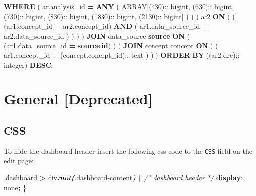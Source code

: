 \documentclass[
]{book}
\newenvironment{Shaded}{\begin{snugshade}}{\end{snugshade}}
\newcommand{\CommentTok}[1]{\textcolor[rgb]{0.56,0.35,0.01}{\textit{#1}}}
\newcommand{\DataTypeTok}[1]{\textcolor[rgb]{0.13,0.29,0.53}{#1}}
\newcommand{\DecValTok}[1]{\textcolor[rgb]{0.00,0.00,0.81}{#1}}
\newcommand{\FunctionTok}[1]{\textcolor[rgb]{0.00,0.00,0.00}{#1}}
\newcommand{\InformationTok}[1]{\textcolor[rgb]{0.56,0.35,0.01}{\textbf{\textit{#1}}}}
\newcommand{\KeywordTok}[1]{\textcolor[rgb]{0.13,0.29,0.53}{\textbf{#1}}}
\newcommand{\NormalTok}[1]{#1}
\newcommand{\OperatorTok}[1]{\textcolor[rgb]{0.81,0.36,0.00}{\textbf{#1}}}
\begin{document}
\begin{Shaded}
\begin{Highlighting}[]
          \KeywordTok{WHERE}
\NormalTok{            (}
\NormalTok{              ar.analysis\_id }\OperatorTok{=} \KeywordTok{ANY}\NormalTok{ (}
                \DataTypeTok{ARRAY}\NormalTok{[(}\DecValTok{430}\NormalTok{):: bigint,}
\NormalTok{                (}\DecValTok{630}\NormalTok{):: bigint,}
\NormalTok{                (}\DecValTok{730}\NormalTok{):: bigint,}
\NormalTok{                (}\DecValTok{830}\NormalTok{):: bigint,}
\NormalTok{                (}\DecValTok{1830}\NormalTok{):: bigint,}
\NormalTok{                (}\DecValTok{2130}\NormalTok{):: bigint]}
\NormalTok{              )}
\NormalTok{            )}
\NormalTok{        ) ar2 }\KeywordTok{ON}\NormalTok{ (}
\NormalTok{          (}
\NormalTok{            (ar1.concept\_id }\OperatorTok{=}\NormalTok{ ar2.concept\_id)}
            \KeywordTok{AND}\NormalTok{ (}
\NormalTok{              ar1.data\_source\_id }\OperatorTok{=}\NormalTok{ ar2.data\_source\_id}
\NormalTok{            )}
\NormalTok{          )}
\NormalTok{        )}
\NormalTok{      )}
      \KeywordTok{JOIN}\NormalTok{ data\_source }\KeywordTok{source} \KeywordTok{ON}\NormalTok{ (}
\NormalTok{        (ar1.data\_source\_id }\OperatorTok{=} \KeywordTok{source}\NormalTok{.}\KeywordTok{id}\NormalTok{)}
\NormalTok{      )}
\NormalTok{    )}
    \KeywordTok{JOIN}\NormalTok{ concept concept }\KeywordTok{ON}\NormalTok{ (}
\NormalTok{      (}
\NormalTok{        ar1.concept\_id }\OperatorTok{=}\NormalTok{ (concept.concept\_id):: text}
\NormalTok{      )}
\NormalTok{    )}
\NormalTok{  )}
\KeywordTok{ORDER} \KeywordTok{BY}\NormalTok{ ((ar2.drc):: }\DataTypeTok{integer}\NormalTok{) }\KeywordTok{DESC}\NormalTok{;}
\end{Highlighting}
\end{Shaded}

\hypertarget{general-deprecated}{%
\section{General {[}Deprecated{]}}\label{general-deprecated}}

\hypertarget{css-2}{%
\subsection*{CSS}\label{css-2}}

To hide the dashboard header insert the following css code to the \texttt{CSS} field on the edit page:

\begin{Shaded}
\begin{Highlighting}[]
\FunctionTok{.dashboard} \OperatorTok{\textgreater{}}\NormalTok{ div}\InformationTok{:not(}\FunctionTok{.dashboard{-}content}\InformationTok{)}\NormalTok{ \{  }\CommentTok{/* dashboard header */}
  \KeywordTok{display}\NormalTok{: }\DecValTok{none}\OperatorTok{;}
\NormalTok{\}}
\end{Highlighting}
\end{Shaded}
\end{document}
